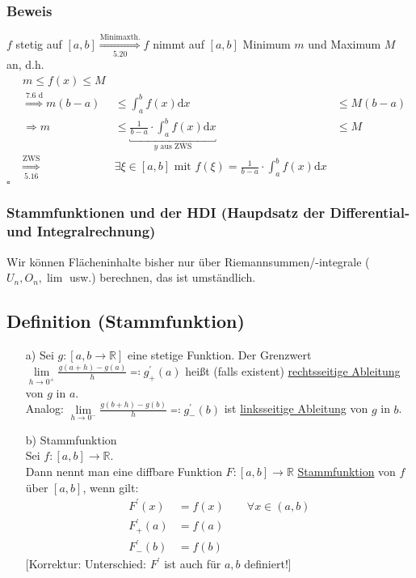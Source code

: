 \documentclass[12pt, titlepage]{article}
\newcommand{\R}{\mathds{R}}
\renewcommand{\>}{\rightarrow}
\renewcommand{\*}{\cdot}
\begin{document}
	\subsubsection*{Beweis}
	$f$ stetig auf $[a,b]\overset{\textrm{Minimaxth.}}{\underset{\textrm{5.20}}{\Rightarrow}}f$ nimmt auf $[a,b]$ Minimum $m$ und Maximum $M$ an, d.h.\\
	\begin{align*}
		&m\leq f(x)\leq M&&\\
		&\overset{\textrm{7.6 d}}{\Rightarrow}m(b-a)&\leq\int_{a}^{b}f(x)\textrm{d}x&\leq M(b-a)\\
		&\Rightarrow m&\leq\underbracket{\frac{1}{b-a}\*\int_{a}^{b}f(x)\textrm{d}x}_{y\textrm{ aus ZWS}}&\leq M\\
		&\overset{\textrm{ZWS}}{\underset{\textrm{5.16}}{\Rightarrow}}&\exists\xi\in[a,b]\textrm{ mit }f(\xi)=\frac{1}{b-a}\*\int_{a}^{b}f(x)\textrm{d}x&
	\end{align*}
	\hfill$\square$
	\subsubsection*{Stammfunktionen und der HDI (Haupdsatz der Differential- und Integralrechnung)}
	Wir können Flächeninhalte bisher nur über Riemannsummen/-integrale ($U_n,O_n,\lim$ usw.) berechnen, das ist umständlich.
	\subsection{Definition (Stammfunktion)}
	\begin{itemize}
		\item[a)] Sei $g\colon[a,b\>\R]$ eine stetige Funktion. Der Grenzwert $\lim\limits_{h\>0^+}\frac{g(a+h)-g(a)}{h}\eqqcolon g^\prime_+(a)$ heißt (falls existent) \underline{rechtsseitige Ableitung} von $g$ in $a$.\\
		Analog: $\lim\limits_{h\>0^-}\frac{g(b+h)-g(b)}{h}\eqqcolon g^\prime_-(b)$ ist \underline{linksseitige Ableitung} von $g$ in $b$.
		\item[b)] Stammfunktion\\
		 Sei $f\colon[a,b]\>\R$.\\Dann nennt man eine diffbare Funktion $F\colon[a,b]\>\R$ \underline{Stammfunktion} von $f$ über $[a,b]$, wenn gilt:
		\begin{align*}
			F^\prime(x)&=f(x)\qquad\forall x\in(a,b)\\
			F^\prime_+(a)&=f(a)\\
			F^\prime_-(b)&=f(b)
		\end{align*}
		[Korrektur: Unterschied: $F^\prime$ ist auch für $a,b$ definiert!]
	\end{itemize}
\end{document}
